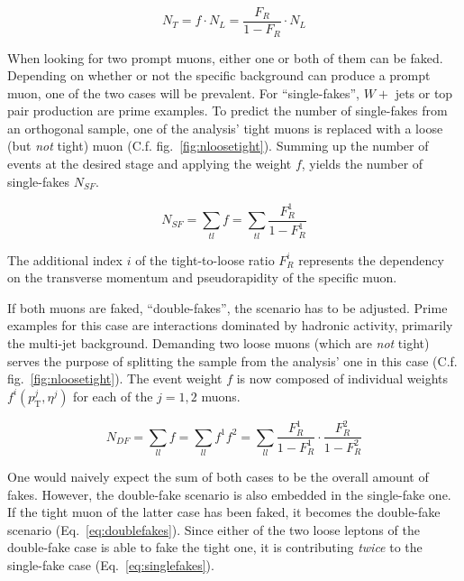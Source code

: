 \begin{equation}
  \label{eq:fakerate}
  N_T = f \cdot N_L = \frac{F_R }{1 - F_R} \cdot N_L
\end{equation}

When looking for two prompt muons, either one or both of them can be faked. Depending on whether or not the specific background can produce a prompt muon, one of the two cases will be prevalent. For ``single-fakes'', $W +$ jets or top pair production are prime examples. To predict the number of single-fakes from an orthogonal sample, one of the analysis' tight muons is replaced with a loose (but \textit{not} tight) muon (C.f. fig.~\ref{fig:nloosetight}). Summing up the number of events at the desired stage and applying the weight $f$, yields the number of single-fakes $N_{SF}$.

\begin{equation}
  \label{eq:singlefakes}
  N_{SF} = \sum_{tl} f = \sum_{tl} \frac{F_R^1}{1 - F_R^1}
\end{equation}

\noindent The additional index $i$ of the tight-to-loose ratio $F_R^i$ represents the dependency on the transverse momentum and pseudorapidity of the specific muon. 

If both muons are faked, ``double-fakes'', the scenario has to be adjusted. Prime examples for this case are interactions dominated by hadronic activity, primarily the multi-jet background. Demanding two loose muons (which are \textit{not} tight) serves the purpose of splitting the sample from the analysis' one in this case (C.f. fig.~\ref{fig:nloosetight}). The event weight $f$ is now composed of individual weights $f^i (p_{\text{T}}^j, \eta^j)$ for each of the $j = 1, 2$ muons.

\begin{equation}
  \label{eq:doublefakes}
  N_{DF} = \sum_{ll} f = \sum_{ll} f^1 f^2 = \sum_{ll} \frac{F_R^1}{1 - F_R^1} \cdot \frac{F_R^2}{1 - F_R^2}
\end{equation}

One would naively expect the sum of both cases to be the overall amount of fakes. However, the double-fake scenario is also embedded in the single-fake one. If the tight muon of the latter case has been faked, it becomes the double-fake scenario (Eq.~\ref{eq:doublefakes}). Since either of the two loose leptons of the double-fake case is able to fake the tight one, it is contributing \textit{twice} to the single-fake case (Eq.~\ref{eq:singlefakes}).

